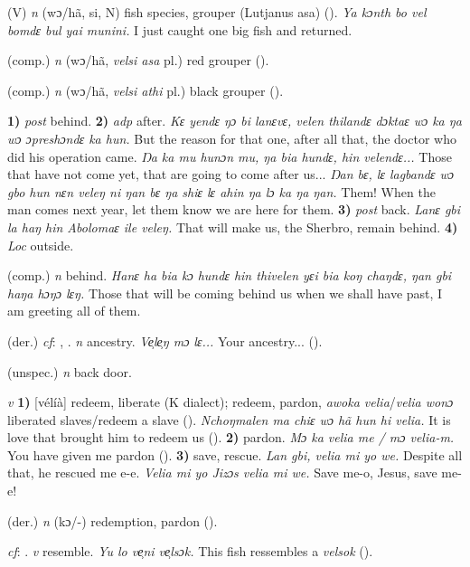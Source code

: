 \begin{letter}{(V)}
 \textit{n} (wɔ/hã, si, N) fish species, grouper (Lutjanus asa) (\citealt{Pichl1967}). \textit{Ya kɔnth bo vel bomdɛ bul yai munini.} I just caught one big fish and returned.

 (comp.) \textit{n} (wɔ/hã, \textit{velsi asa} pl.) red grouper (\citealt{Pichl1967}).

 (comp.) \textit{n} (wɔ/hã, \textit{velsi athi} pl.) black grouper (\citealt{Pichl1967}). 

 \textbf{1)} \textit{post} behind. \textbf{2)} \textit{adp} after. \textit{Kɛ yendɛ ŋɔ bi lanɛvɛ, velen thilandɛ dɔktaɛ wɔ ka ŋa wɔ ɔpreshɔndɛ ka hun.} But the reason for that one, after all that, the doctor who did his operation came. \textit{Ŋa ka mu hunɔn mu, ŋa bia hundɛ, hin velendɛ...} Those that have not come yet, that are going to come after us... \textit{Ŋan bɛ, lɛ lagbandɛ wɔ gbo hun nɛn veleŋ ni ŋan bɛ ŋa shiɛ lɛ ahin ŋa lɔ ka ŋa ŋan.} Them! When the man comes next year, let them know we are here for them. \textbf{3)} \textit{post} back. \textit{Lanɛ gbi la haŋ hin Abolomaɛ ile veleŋ.} That will make us, the Sherbro, remain behind. \textbf{4)} \textit{Loc} outside.

 (comp.) \textit{n} behind. \textit{Hanɛ ha bia kɔ hundɛ hin thivelen yɛi bia koŋ chaŋdɛ, ŋan gbi haŋa hɔŋɔ lɛŋ.} Those that will be coming behind us when we shall have past, I am greeting all of them.

 (der.) \textit{cf}: , . \textit{n} ancestry. \textit{Ve̹le̹ŋ mɔ lɛ...} Your ancestry... (\citealt{Pichl1967}). 

 (unspec.) \textit{n} back door.

 \textit{v} \textbf{1)} [vélíà] redeem, liberate (K dialect); redeem, pardon, \textit{awoka velia}/\textit{velia wonɔ} liberated slaves/redeem a slave (\citealt{Pichl1967}). \textit{Nchoŋmalen ma chiɛ wɔ hã hun hi velia.} It is love that brought him to redeem us (\citealt{Pichl1967}). \textbf{2)} pardon. \textit{Mɔ ka velia me / mɔ velia-m.} You have given me pardon (\citealt{Pichl1967}). \textbf{3)} save, rescue. \textit{Lan gbi, velia mi yo we.} Despite all that, he rescued me e-e. \textit{Velia mi yo Jizɔs velia mi we.} Save me-o, Jesus, save me-e!

 (der.) \textit{n} (kɔ/-) redemption, pardon (\citealt{Pichl1967}). 

 \textit{cf}: . \textit{v} resemble. \textit{Yu lo ve̹ni ve̹lsɔk.} This fish ressembles a \textit{velsok} (\citealt{Pichl1967}). 


\end{letter}
